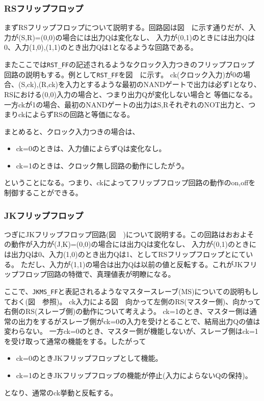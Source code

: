 \documentclass[11pt,a4j]{jsarticle}
\begin{document}
  \newpage
  
  \subsubsection{RSフリップフロップ}
  まずRSフリップフロップについて説明する。回路図は図\ \ に示す通りだが、入力が(S,R)=(0,0)の場合には出力Qは変化なし、
  入力が(0,1)のときには出力Qは0、入力(1,0),(1,1)のとき出力Qは1となるような回路である。
  
  
  またここでは\verb|RST_FF|の記述されるようなクロック入力つきのフリップフロップ回路の説明もする。例として\verb|RST_FF|を図\ \ に示す。
  ck(クロック入力)が0の場合、(S,ck),(R,ck)を入力とするような最初のNANDゲートで出力は必ず1となり、RSにおける(0,0)入力の場合と、つまり出力Qが変化しない場合と
  等価になる。一方ckが1の場合、最初のNANDゲートの出力はS,RそれぞれのNOT出力と、つまりckによらずRSの回路と等価になる。
  
  まとめると、クロック入力つきの場合は、
  \begin{itemize}
   \item ck=0のときは、入力値によらずQは変化なし。
   \item ck=1のときは、クロック無し回路の動作にしたがう。
  \end{itemize}
  ということになる。つまり、ckによってフリップフロップ回路の動作のon,offを制御することができる。
  
  \newpage
  
  
  \subsubsection{JKフリップフロップ}
  つぎにJKフリップフロップ回路(図\ \ )について説明する。この回路はおおよその動作が入力が(J,K)=(0,0)の場合には出力Qは変化なし、
  入力が(0,1)のときには出力Qは0、入力(1,0)のとき出力Qは1、としてRSフリップフロップとにている。
  ただし、入力が(1,1)の場合は出力Qは以前の値と反転する。これがJKフリップフロップ回路の特徴で、真理値表が明瞭になる。
  
  ここで、\verb|JKMS_FF|と表記されるようなマスタースレーブ(MS)についての説明もしておく(図\ \ 参照)。
  ck入力による図\ \ 向かって左側のRS(マスター側)、向かって右側のRS(スレーブ側)の動作について考えよう。
  ck=1のとき、マスター側は通常の出力をするがスレーブ側がck=0の入力を受けとることで、結局出力Qの値は変わらない。
  一方ck=0のとき、マスター側が機能しないが、スレーブ側はck=1を受け取って通常の機能をする。したがって
  \begin{itemize}
   \item ck=0のときJKフリップフロップとして機能。
   \item ck=1のときJKフリップフロップの機能が停止(入力によらないQの保持)。
  \end{itemize}
  となり、通常のck挙動と反転する。
  
\end{document}
